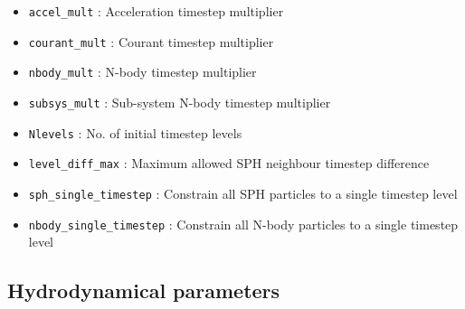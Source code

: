 \documentclass[a4paper]{article}
\newcommand{\var}[1]{\texttt{#1}}
\begin{document}
\begin{itemize}

\item \var{accel\_mult} : Acceleration timestep multiplier

\item \var{courant\_mult} : Courant timestep multiplier

\item \var{nbody\_mult} : N-body timestep multiplier

\item \var{subsys\_mult} : Sub-system N-body timestep multiplier

\item \var{Nlevels} : No. of initial timestep levels

\item \var{level\_diff\_max} : Maximum allowed SPH neighbour timestep difference

\item \var{sph\_single\_timestep} : Constrain all SPH particles to a single timestep level

\item \var{nbody\_single\_timestep} : Constrain all N-body particles to a single timestep level


\end{itemize}




\subsection{Hydrodynamical parameters}
\end{document}
